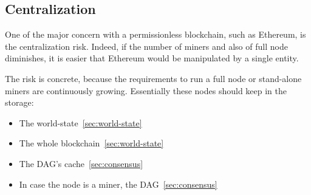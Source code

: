 \subsection{Centralization}

One of the major concern with a permissionless blockchain, such as Ethereum,
is the centralization risk. Indeed, if the number of miners and also of full
node diminishes, it is easier that Ethereum would be manipulated by a single
entity.

The risk is concrete, because the requirements to run a full node or 
stand-alone miners are continuously growing. Essentially these nodes should
keep in the storage:
\begin{itemize}
    \item The world-state~\autoref{sec:world-state}
    \item The whole blockchain~\autoref{sec:world-state}
    \item The DAG's cache~\autoref{sec:consensus}
    \item In case the node is a miner, the DAG~\autoref{sec:consensus}
\end{itemize}

